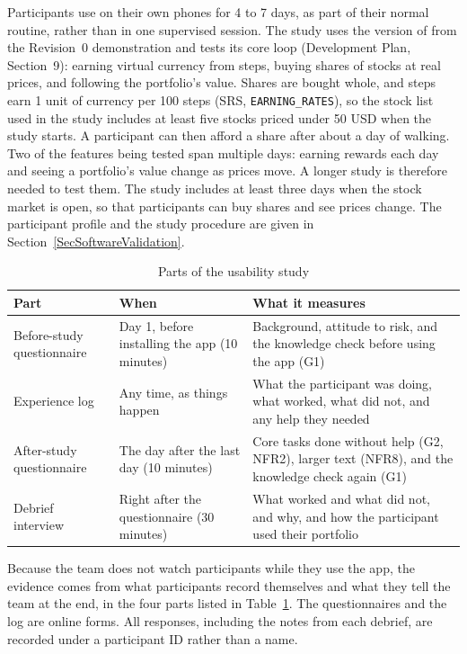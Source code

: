 \documentclass[12pt, titlepage]{article}
\begin{document}
Participants use \progname{} on their own phones for 4 to 7 days, as part of
their normal routine, rather than in one supervised session. The study uses
the version of \progname{} from the Revision~0 demonstration and tests its core
loop (Development Plan, Section~9): earning virtual currency from steps, buying
shares of stocks at real prices, and following the portfolio's value. Shares
are bought whole, and steps earn 1 unit of currency per 100 steps (SRS,
\texttt{EARNING\_RATES}), so the stock list used in the study includes at least
five stocks priced under 50 USD when the study starts. A participant can then
afford a share after about a day of walking. Two
of the features being tested span multiple days: earning rewards each day and
seeing a portfolio's value change as prices move. A longer study is therefore
needed to test them. The study includes at least three days when the stock
market is open, so that participants can buy shares and see prices change. The
participant profile and the study procedure are given in
Section~\ref{SecSoftwareValidation}.

\begin{table}[!ht]
\caption{Parts of the usability study} \label{TblUsabilityStudyParts}
\small
\begin{tabularx}{\textwidth}{>{\raggedright\arraybackslash}p{}
  >{\raggedright\arraybackslash}p{}
  >{\raggedright\arraybackslash}X}
\toprule
\textbf{Part} & \textbf{When} & \textbf{What it measures}\\
\midrule
Before-study questionnaire & Day 1, before installing the app (10 minutes) &
  Background, attitude to risk, and the knowledge check before using the app
  (G1)\\
Experience log & Any time, as things happen &
  What the participant was doing, what worked, what did not, and any help
  they needed\\
After-study questionnaire & The day after the last day (10 minutes) &
  Core tasks done without help (G2, NFR2), larger text (NFR8), and the
  knowledge check again (G1)\\
Debrief interview & Right after the questionnaire (30 minutes) &
  What worked and what did not, and why, and how the participant used their
  portfolio\\
\bottomrule
\end{tabularx}
\end{table}

Because the team does not watch participants while they use the app, the
evidence comes from what participants record themselves and what they tell the
team at the end, in the four parts listed in Table~\ref{TblUsabilityStudyParts}.
The questionnaires and the log are online forms. All responses, including the
notes from each debrief, are recorded under a participant ID rather than a
name.
\end{document}
